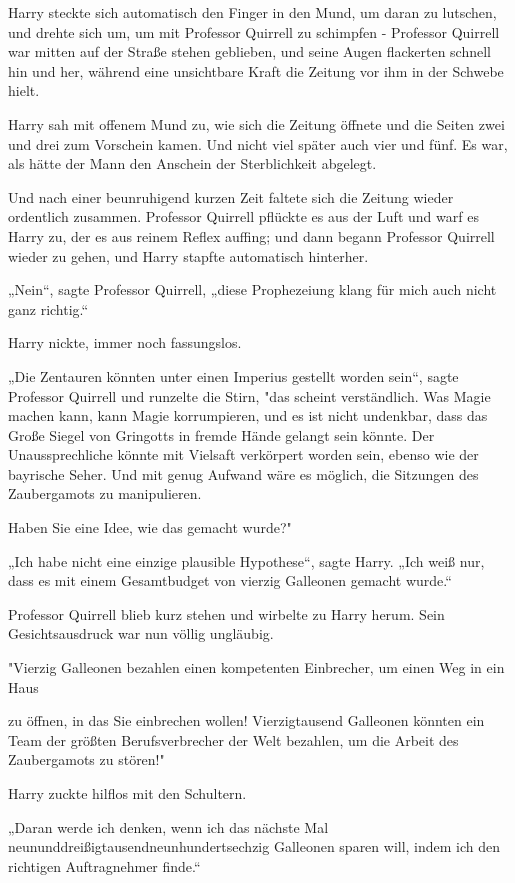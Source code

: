 {Harry steckte sich automatisch den Finger in den Mund, um daran zu lutschen, und drehte sich um, um mit Professor Quirrell zu schimpfen - Professor Quirrell war mitten auf der Straße stehen geblieben, und seine Augen flackerten schnell hin und her, während eine unsichtbare Kraft die Zeitung vor ihm in der Schwebe hielt.

Harry sah mit offenem Mund zu, wie sich die Zeitung öffnete und die Seiten zwei und drei zum Vorschein kamen. Und nicht viel später auch vier und fünf. Es war, als hätte der Mann den Anschein der Sterblichkeit abgelegt.

Und nach einer beunruhigend kurzen Zeit faltete sich die Zeitung wieder ordentlich zusammen. Professor Quirrell pflückte es aus der Luft und warf es Harry zu, der es aus reinem Reflex auffing; und dann begann Professor Quirrell wieder zu gehen, und Harry stapfte automatisch hinterher.

„Nein“, sagte Professor Quirrell, „diese Prophezeiung klang für mich auch nicht ganz richtig.“

Harry nickte, immer noch fassungslos.

„Die Zentauren könnten unter einen Imperius gestellt worden sein“, sagte Professor Quirrell und runzelte die Stirn, "das scheint verständlich. Was Magie machen kann, kann Magie korrumpieren, und es ist nicht undenkbar, dass das Große Siegel von Gringotts in fremde Hände gelangt sein könnte. Der Unaussprechliche könnte mit Vielsaft verkörpert worden sein, ebenso wie der bayrische Seher. Und mit genug Aufwand wäre es möglich, die Sitzungen des Zaubergamots zu manipulieren.

Haben Sie eine Idee, wie das gemacht wurde?"

„Ich habe nicht eine einzige plausible Hypothese“, sagte Harry. „Ich weiß nur, dass es mit einem Gesamtbudget von vierzig Galleonen gemacht wurde.“

Professor Quirrell blieb kurz stehen und wirbelte zu Harry herum. Sein Gesichtsausdruck war nun völlig ungläubig.

"Vierzig Galleonen bezahlen einen kompetenten Einbrecher, um einen Weg in ein Haus

zu öffnen, in das Sie einbrechen wollen! Vierzigtausend Galleonen könnten ein Team der größten Berufsverbrecher der Welt bezahlen, um die Arbeit des Zaubergamots zu stören!"

Harry zuckte hilflos mit den Schultern.

„Daran werde ich denken, wenn ich das nächste Mal neununddreißigtausendneunhundertsechzig Galleonen sparen will, indem ich den richtigen Auftragnehmer finde.“

}

